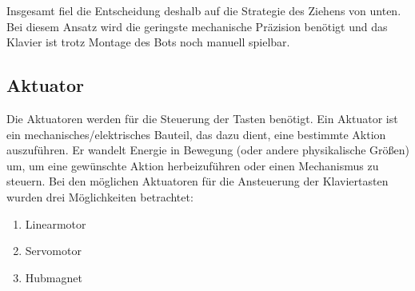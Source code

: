 Insgesamt fiel die Entscheidung deshalb auf die Strategie des Ziehens von unten.
Bei diesem Ansatz wird die geringste mechanische Präzision benötigt und das Klavier ist trotz Montage des Bots noch manuell spielbar.

\subsection{Aktuator}\label{subsec:aktuator}
Die Aktuatoren werden für die Steuerung der Tasten benötigt.
Ein Aktuator ist ein mechanisches/elektrisches Bauteil, das dazu dient,
eine bestimmte Aktion auszuführen.
Er wandelt Energie in Bewegung (oder andere physikalische Größen) um, um eine gewünschte Aktion herbeizuführen
oder einen Mechanismus zu steuern. \newline %
Bei den möglichen Aktuatoren für die Ansteuerung der Klaviertasten wurden drei Möglichkeiten betrachtet: %
\begin{enumerate}
	\item Linearmotor
	\item Servomotor
	\item Hubmagnet
\end{enumerate}

